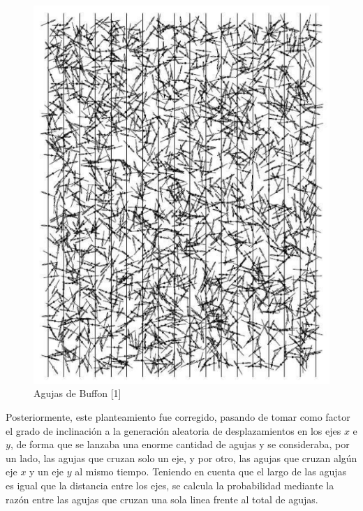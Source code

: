 \begin{itemize}
    \begin{center}
        \begin{figure}[H]
            \begin{center}
                \includegraphics[scale=0.4]{images/agujasbuffon.PNG}
                \caption{Agujas de Buffon [1]}
                \label{fig:my_label}
            \end{center}
        \end{figure}
    \end{center}
    
    Posteriormente, este planteamiento fue corregido, pasando de tomar como factor el grado de inclinación a la generación aleatoria de desplazamientos en los ejes $x$ e $y$, de forma que se lanzaba una enorme cantidad de agujas y se consideraba, por un lado, las agujas que cruzan solo un eje, y por otro, las agujas que cruzan algún eje $x$ y un eje $y$ al mismo tiempo. Teniendo en cuenta que el largo de las agujas es igual que la distancia entre los ejes, se calcula la probabilidad mediante la razón entre las agujas que cruzan una sola linea frente al total de agujas. 
    

\end{itemize}

